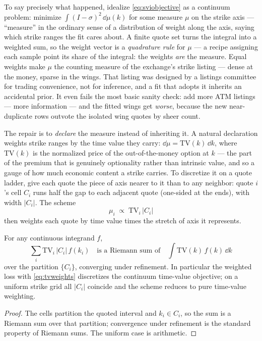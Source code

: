 To say precisely what happened, idealize \eqref{eq:sviobjective} as a
continuum problem: minimize $\int(I-\sigma)^2\,\dd\mu(k)$ for some
measure $\mu$ on the strike axis --- ``measure'' in the ordinary sense
of a distribution of weight along the axis, saying which strike ranges
the fit cares about.  A finite quote set turns the integral into a
weighted sum, so the weight vector is a \emph{quadrature rule} for
$\mu$ --- a recipe assigning each sample point its share of the
integral: the weights \emph{are} the measure.  Equal weights make $\mu$ the counting
measure of the exchange's strike listing --- dense at the money, sparse
in the wings.  That listing was designed by a listings committee for
trading convenience, not for inference, and a fit that adopts it
inherits an accidental prior.  It even fails the most basic sanity
check: add more ATM listings --- more information --- and the fitted
wings get \emph{worse}, because the new near-duplicate rows outvote the
isolated wing quotes by sheer count.

The repair is to \emph{declare} the measure instead of inheriting it.
A natural declaration weights strike ranges by the time value they
carry: $\dd\mu=\mathrm{TV}(k)\,\dd k$, where $\mathrm{TV}(k)$ is the
normalized price of the out-of-the-money option at $k$ --- the part of
the premium that is genuinely optionality rather than intrinsic value,
and so a gauge of how much economic content a strike carries.  To
discretize it on a quote ladder, give each quote the piece of axis
nearer to it than to any neighbor: quote $i$'s cell $C_i$ runs half the
gap to each adjacent quote (one-sided at the ends), with width $|C_i|$.
The scheme
\begin{equation}
\mu_i\;\propto\;\mathrm{TV}_i\,|C_i|
\label{eq:tvweights}
\end{equation}
then weights each quote by time value times the stretch of axis it
represents.

\begin{proposition}
\label{prop:quadrature}
For any continuous integrand $f$,
\[
\sum_i\mathrm{TV}_i\,|C_i|\,f(k_i)
\quad\text{is a Riemann sum of}\quad
\int\mathrm{TV}(k)\,f(k)\,\dd k
\]
over the partition $\{C_i\}$, converging under refinement.  In
particular the weighted loss with
\eqref{eq:tvweights} discretizes the continuum time-value objective;
on a uniform strike grid all $|C_i|$ coincide and the scheme reduces
to pure time-value weighting.
\end{proposition}

\begin{proof}
The cells partition the quoted interval and $k_i\in C_i$, so the sum
is a Riemann sum over that partition; convergence under refinement is
the standard property of Riemann sums.  The uniform case is
arithmetic.
\end{proof}

